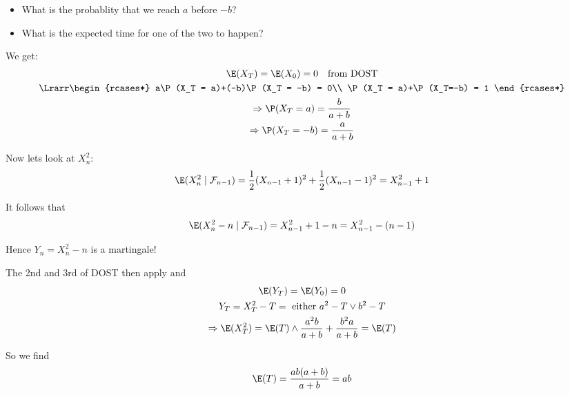 \begin{itemize}
  \item What is the probablity that we reach $a$ before $-b$?
  \item What is the expected time for one of the two to happen?
\end{itemize}
\par\bigskip
\noindent We get:
\begin{equation*}
  \begin{gathered}
    \E(X_T) = \E(X_0) = 0\quad\text{from DOST}\\
    \Lrarr 
    \begin{rcases*}
      a\P(X_T = a)+(-b)\P(X_T = -b) = 0\\
      \P(X_T = a)+\P(X_T=-b) = 1
    \end{rcases*}\\
    \Rightarrow \P(X_T = a) = \dfrac{b}{a+b}\\
    \Rightarrow \P(X_T = -b) = \dfrac{a}{a+b}
  \end{gathered}
\end{equation*}
\par\bigskip
\noindent Now lets look at $X_n^2$:
\begin{equation*}
  \begin{gathered}
    \E(X_n^2\mid\mathcal{F}_{n-1}) = \dfrac{1}{2}(X_{n-1}+1)^2+\dfrac{1}{2}(X_{n-1}-1)^2 = X_{n-1}^2+1
  \end{gathered}
\end{equation*}
\par\bigskip
\noindent It follows that
\begin{equation*}
  \begin{gathered}
    \E(X_n^2-n\mid\mathcal{F}_{n-1}) = X_{n-1}^2+1-n = X_{n-1}^2-(n-1)
  \end{gathered}
\end{equation*}\par
\noindent Hence $Y_n = X_n^2-n$ is a martingale!\par
\noindent The 2nd and 3rd of DOST then apply and 
\begin{equation*}
  \begin{gathered}
    \E(Y_T) = \E(Y_0) =0\\
    Y_T = X_T^2-T = \text{ either } a^2-T \vee b^2-T\\
    \Rightarrow \E(X_T^2) =\E(T)\wedge \dfrac{a^2b}{a+b}+\dfrac{b^2a}{a+b} = \E(T)
  \end{gathered}
\end{equation*}\par
\noindent So we find 
\begin{equation*}
  \begin{gathered}
    \E(T) = \dfrac{ab(a+b)}{a+b} = ab
  \end{gathered}
\end{equation*}
